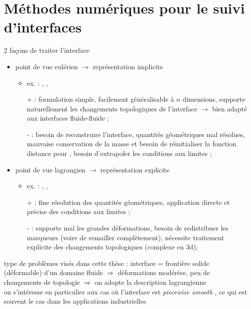 \section*{Méthodes numériques pour le suivi d'interfaces}
2 façons de traiter l'interface
\begin{itemize}
	\item point de vue eulérien $\to$ représentation implicite
	\begin{itemize}
		\item ex. :  \cite{sethian1999},  \cite{gueyffier1999}, \etc
		\item[+] : formulation simple, facilement généralisable à $n$ dimensions, supporte naturellement les changements topologiques de l'interface $\to$ bien adapté aux interfaces fluide-fluide ;
		\item[-] : besoin de reconstruire l'interface, quantités géométriques mal résolues, mauvaise conservation de la masse et besoin de réinitialiser la fonction distance pour , besoin d'extrapoler les conditions aux limites ;
	\end{itemize}
	
	\item point de vue lagrangien $\to$ représentation explicite
	\begin{itemize}
		\item ex. :  \cite{popinet1999, tryggvason2001},  \cite{jiao2007}, \etc
		\item[+] : fine résolution des quantités géométriques, application directe et précise des conditions aux limites ;
		\item[-] : supporte mal les grandes déformations, besoin de redistribuer les marqueurs (voire de remailler complètement), nécessite traitement explicite des changements topologiques (complexe en 3d);
	\end{itemize}
\end{itemize}

\bigskip
type de problèmes visés dans cette thèse : interface = frontière solide (déformable) d'un domaine fluide $\Rightarrow$ déformations modérées, peu de changements de topologie $\Rightarrow$ on adopte la description lagrangienne\\
on s'intéresse en particulier aux cas où l'interface est \emph{piecewise smooth}%
, ce qui est souvent le cas dans les applications industrielles\\

